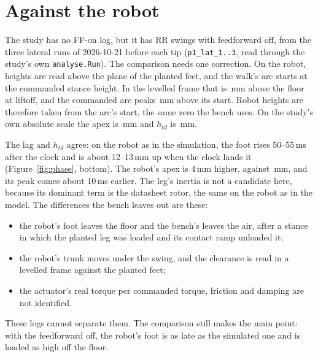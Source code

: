 \documentclass[11pt,a4paper]{article}
\newcommand{\code}[1]{\texttt{#1}}
\begin{document}
\section{Against the robot}
\label{sec:robot}

The study has no FF-on log, but it has \RobN{} RR swings with feedforward off,
from the three lateral runs of 2026-10-21 before each tip (\code{p1\_lat\_1..3},
read through the study's own \code{analyse.Run}). The comparison needs one
correction. On the robot, heights are read above the plane of the planted
feet, and the walk's arc starts at the commanded stance height. In the levelled
frame that is \RobZlo\,mm above the floor at liftoff, and the commanded arc
peaks \RobRefPk\,mm above its start. Robot heights are therefore taken from the
arc's start, the same zero the bench uses. On the study's own absolute scale
the apex is \RobApexAbs\,mm and $h_{td}$ is \RobHtdAbs\,mm.

\begin{table}[h]
\centering\small

\caption{The robot (feedforward off, on the floor, walking) against the hung-up
leg with the feedforward off and on. Medians, with the 10th and 90th
percentiles.}
\label{tab:robot}
\end{table}

The lag and $h_{td}$ agree: on the robot as in the simulation, the foot rises
50--55\,ms after the clock and is about 12--13\,mm up when the clock lands it
(Figure~\ref{fig:phase}, bottom). The robot's apex is 4\,mm higher, \RobApex{}
against \ApexOff\,mm, and its peak comes about 10\,ms earlier. The leg's
inertia is not a candidate here, because its dominant term is the datasheet
rotor, the same on the robot as in the model. The differences the bench leaves
out are these:
\begin{itemize}[leftmargin=1.5em]
\item the robot's foot leaves the floor and the bench's leaves the air, after a
stance in which the planted leg was loaded and its contact ramp unloaded it;
\item the robot's trunk moves under the swing, and the clearance is read in a
levelled frame against the planted feet;
\item the actuator's real torque per commanded torque, friction and damping
are not identified.
\end{itemize}
These logs cannot separate them. The comparison still makes the main point:
with the feedforward off, the robot's foot is as late as the simulated one and
is loaded as high off the floor.
\end{document}
